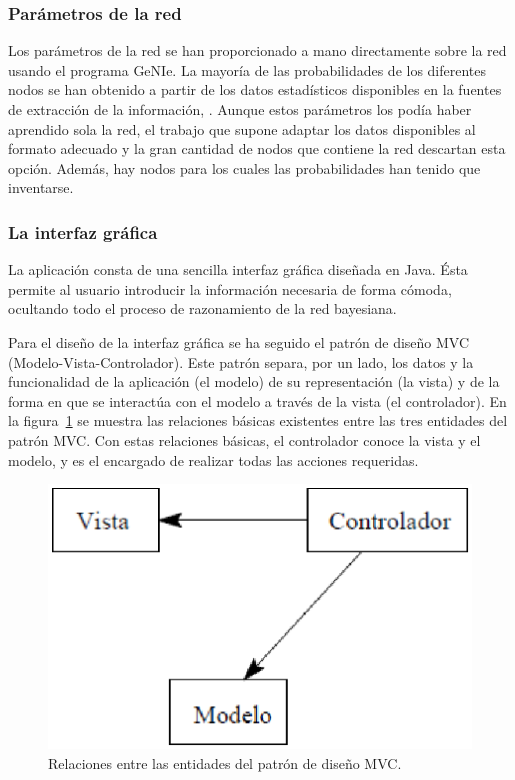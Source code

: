 \documentclass[a4paper,12pt]{article}
\begin{document}
  \subsubsection{Parámetros de la red}
\par
Los parámetros de la red se han proporcionado a mano directamente sobre la red usando el programa GeNIe.
La mayoría de las probabilidades de los diferentes nodos se han obtenido a partir de los datos estadísticos disponibles en la fuentes de extracción de la información, \cite{GM0910}.
Aunque estos parámetros los podía haber aprendido sola la red,
el trabajo que supone adaptar los datos disponibles al formato adecuado y la gran cantidad de nodos que contiene la red descartan esta opción.
Además, hay nodos para los cuales las probabilidades han tenido que inventarse.

\subsubsection{La interfaz gráfica}
\par
La aplicación consta de una sencilla interfaz gráfica diseñada en Java.
Ésta permite al usuario introducir la información necesaria de forma cómoda,
ocultando todo el proceso de razonamiento de la red bayesiana.
\par
Para el diseño de la interfaz gráfica se ha seguido el patrón de diseño MVC (Modelo-Vista-Controlador).
Este patrón separa, por un lado, los datos y la funcionalidad de la aplicación (el modelo)
de su representación (la vista) y de la forma en que se interactúa con el modelo a través de la vista (el controlador).
En la figura~\ref{fig:mvc} se muestra las relaciones básicas existentes entre las tres entidades del patrón MVC.
Con estas relaciones básicas, el controlador conoce la vista y el modelo, y es el encargado de realizar todas las acciones requeridas.
\begin{figure}[h]
 \begin{center}
  \includegraphics[scale=0.5]{mvc.eps}
\caption{Relaciones entre las entidades del patrón de diseño MVC.}
\label{fig:mvc}
 \end{center}
\end{figure} 
\end{document}
